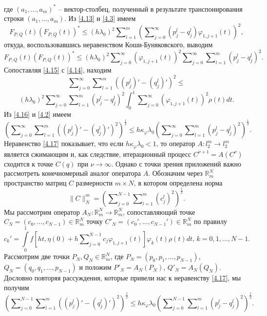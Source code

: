 где $(a_1,\ldots,a_m)^*$ -- вектор-столбец, полученный в результате транспонирования строки $(a_1,\ldots,a_m)$.
Из \eqref{4.13} и \eqref{4.3}  имеем
$$
F_{P,Q}(t)(F_{P,Q}(t))^*\le (h\lambda_0)^2 \sum\nolimits_{l=1}^m  \left(\sum\nolimits_{j=0}^\infty( p^l_j-q^l_j)\varphi_{1,j+1}(t)\right)^2,
$$
откуда,  воспользовавшись неравенством Коши-Буняковского, выводим
\begin{equation}\label{4.15}
F_{P,Q}(t)(F_{P,Q}(t))^*\le(h\lambda_0)^2  \sum\nolimits_{j=0}^\infty(\varphi_{1,j+1}(t))^2 \sum\nolimits_{j=0}^\infty\sum\nolimits_{l=1}^m( p^l_j-q^l_j)^2.
\end{equation}
Сопоставляя \eqref{4.15} с \eqref{4.14}, находим
$$
\sum\nolimits_{j=0}^\infty\sum\nolimits_{l=1}^m((p^l_j)'-(q^l_j)')^2\le
$$
\begin{equation}\label{4.16}
(h\lambda_0)^2 \sum\nolimits_{j=0}^\infty\sum\nolimits_{l=1}^m( p^l_j-q^l_j)^2\int_{0}^1 \sum\nolimits_{j=0}^\infty(\varphi_{1,j+1}(t))^2\rho(t) dt.
\end{equation}
Из  \eqref{4.16}  и \eqref{4.2} имеем
\begin{equation}\label{4.17}
\left(\sum\nolimits_{j=0}^\infty\sum\nolimits_{l=1}^m((p^l_j)'-(q^l_j)')^2\right)^\frac12\le h\kappa_\varphi\lambda_0 \left(\sum\nolimits_{j=0}^\infty\sum\nolimits_{l=1}^m( p^l_j-q^l_j)^2\right)^\frac12.
\end{equation}
Неравенство \eqref{4.17} показывает, что если $h\kappa_\varphi\lambda_0<1$, то оператор  $A:l_2^m\to l_2^m$ является сжимающим и, как следствие, итерационный процесс $C^{\nu+1}=A(C^{\nu})$  сходится к точке $C(q)$ при $\nu\to\infty$. Однако с точки зрения приложений важно рассмотреть конечномерный аналог оператора $A$. Обозначим через $\mathbb{R}^N_m$ пространство матриц $C$ размерности $m\times N$, в котором определена норма
$$\|C\|_N^m=\left(\sum\nolimits_{j=0}^{N-1} \sum\nolimits_{l=1}^{m}(c_j^l)^2\right)^\frac12.$$
Мы рассмотрим оператор $A_N:\mathbb{R}^N_m\to \mathbb{R}^N_m$, сопоставляющий точке\\
$C_N=(c_0,\ldots,c_{N-1})\in \mathbb{R}^N_m $ точку  $C'_N=(c_0',\ldots,c_{N-1}')\in \mathbb{R}^N_m $ по правилу
\begin{equation}\label{4.18}
c_k'=\int\limits_{0}^1f\left[ht,\eta(0)+ h\sum\nolimits_{j=0}^{N-1} c_j\varphi_{1,j+1}(t)\right]\varphi_k(t)\rho(t) dt,\,k=0,1,\ldots, N-1.
\end{equation}
Рассмотрим две точки $P_N,Q_N\in \mathbb{R}^N_m$, где $P_N=(p_0,p_1,\ldots,p_{N-1})$,\\   $Q_N=(q_0,q_1,\ldots,p_{N-1})$ и положим $P'_N=A_N(P_N)$, $Q'_N=A_N(Q_N)$. Дословно повторяя рассуждения, которые привели нас к неравенству \eqref{4.17}, мы получим
\begin{equation}\label{4.19}
\left(\sum\nolimits_{j=0}^{N-1}\sum\nolimits_{l=1}^m((p^l_j)'-(q^l_j)')^2\right)^\frac12\le h\kappa_\varphi\lambda_0 \left(\sum\nolimits_{j=0}^{N-1}\sum\nolimits_{l=1}^m( p^l_j-q^l_j)^2\right)^\frac12.
\end{equation}

